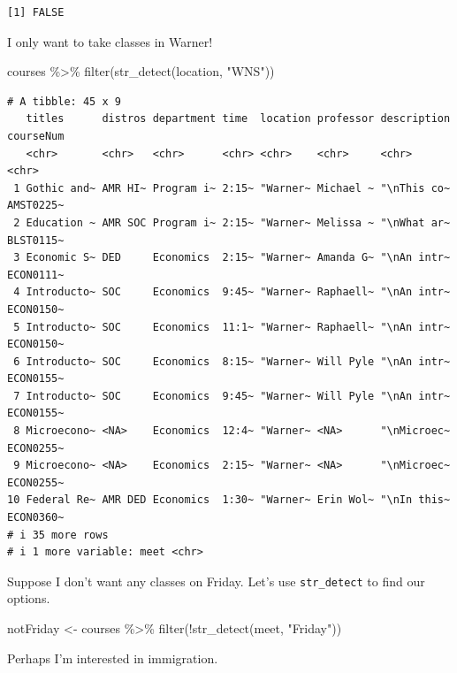 \documentclass[
  letterpaper,
  DIV=11,
  numbers=noendperiod]{scrartcl}
\newenvironment{Shaded}{\begin{snugshade}}{\end{snugshade}}
\newcommand{\FunctionTok}[1]{\textcolor[rgb]{0.28,0.35,0.67}{#1}}
\newcommand{\NormalTok}[1]{\textcolor[rgb]{0.00,0.23,0.31}{#1}}
\newcommand{\OtherTok}[1]{\textcolor[rgb]{0.00,0.23,0.31}{#1}}
\newcommand{\SpecialCharTok}[1]{\textcolor[rgb]{0.37,0.37,0.37}{#1}}
\newcommand{\StringTok}[1]{\textcolor[rgb]{0.13,0.47,0.30}{#1}}
\begin{document}
\begin{verbatim}
[1] FALSE
\end{verbatim}

I only want to take classes in Warner!

\begin{Shaded}
\begin{Highlighting}[]
\NormalTok{courses }\SpecialCharTok{\%\textgreater{}\%} 
  \FunctionTok{filter}\NormalTok{(}\FunctionTok{str\_detect}\NormalTok{(location, }\StringTok{"WNS"}\NormalTok{))}
\end{Highlighting}
\end{Shaded}

\begin{verbatim}
# A tibble: 45 x 9
   titles      distros department time  location professor description courseNum
   <chr>       <chr>   <chr>      <chr> <chr>    <chr>     <chr>       <chr>    
 1 Gothic and~ AMR HI~ Program i~ 2:15~ "Warner~ Michael ~ "\nThis co~ AMST0225~
 2 Education ~ AMR SOC Program i~ 2:15~ "Warner~ Melissa ~ "\nWhat ar~ BLST0115~
 3 Economic S~ DED     Economics  2:15~ "Warner~ Amanda G~ "\nAn intr~ ECON0111~
 4 Introducto~ SOC     Economics  9:45~ "Warner~ Raphaell~ "\nAn intr~ ECON0150~
 5 Introducto~ SOC     Economics  11:1~ "Warner~ Raphaell~ "\nAn intr~ ECON0150~
 6 Introducto~ SOC     Economics  8:15~ "Warner~ Will Pyle "\nAn intr~ ECON0155~
 7 Introducto~ SOC     Economics  9:45~ "Warner~ Will Pyle "\nAn intr~ ECON0155~
 8 Microecono~ <NA>    Economics  12:4~ "Warner~ <NA>      "\nMicroec~ ECON0255~
 9 Microecono~ <NA>    Economics  2:15~ "Warner~ <NA>      "\nMicroec~ ECON0255~
10 Federal Re~ AMR DED Economics  1:30~ "Warner~ Erin Wol~ "\nIn this~ ECON0360~
# i 35 more rows
# i 1 more variable: meet <chr>
\end{verbatim}

Suppose I don't want any classes on Friday. Let's use
\texttt{str\_detect} to find our options.

\begin{Shaded}
\begin{Highlighting}[]
\NormalTok{notFriday }\OtherTok{\textless{}{-}}\NormalTok{ courses }\SpecialCharTok{\%\textgreater{}\%} 
  \FunctionTok{filter}\NormalTok{(}\SpecialCharTok{!}\FunctionTok{str\_detect}\NormalTok{(meet, }\StringTok{"Friday"}\NormalTok{))}
\end{Highlighting}
\end{Shaded}

Perhaps I'm interested in immigration.
\end{document}
